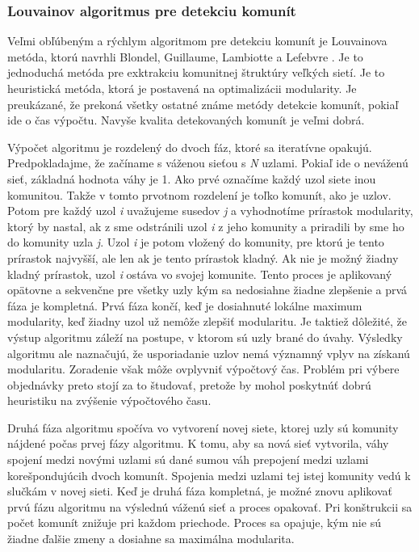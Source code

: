 \documentclass[slovak,master,public,dept460,male,cpdeclaration,oneside]{diploma}
\begin{document}
\subsubsection{Louvainov algoritmus pre detekciu komunít}

Veľmi obľúbeným a rýchlym algoritmom pre detekciu komunít je Louvainova metóda, ktorú navrhli Blondel, Guillaume, Lambiotte a Lefebvre \cite{12}. Je to jednoduchá metóda pre exktrakciu komunitnej štruktúry veľkých sietí. Je to heuristická metóda, ktorá je postavená na optimalizácii modularity. Je preukázané, že prekoná všetky ostatné známe metódy detekcie komunít, pokiaľ ide o čas výpočtu. Navyše kvalita detekovaných komunít je veľmi dobrá.


Výpočet algoritmu je rozdelený do dvoch fáz, ktoré sa iteratívne opakujú. Predpokladajme, že začíname s váženou sieťou s \textit{N} uzlami. Pokiaľ ide o neváženú sieť, základná hodnota váhy je 1. Ako prvé označíme každý uzol siete inou komunitou. Takže v tomto prvotnom rozdelení je toľko komunít, ako je uzlov. Potom pre každý uzol \textit{i} uvažujeme susedov \textit{j} a vyhodnotíme prírastok modularity, ktorý by nastal, ak z sme odstránili uzol \textit{i} z jeho komunity a priradili by sme ho do komunity uzla \textit{j}. Uzol \textit{i} je potom vložený do komunity, pre ktorú je tento prírastok najvyšší, ale len ak je tento prírastok kladný. Ak nie je možný žiadny kladný prírastok, uzol \textit{i} ostáva vo svojej komunite. Tento proces je aplikovaný opätovne a sekvenčne pre všetky uzly kým sa nedosiahne žiadne zlepšenie a prvá fáza je kompletná. Prvá fáza končí, keď je dosiahnuté lokálne maximum modularity, keď žiadny uzol už nemôže zlepšiť modularitu. Je taktiež dôležité, že výstup algoritmu záleží na postupe, v ktorom sú uzly brané do úvahy. Výsledky algoritmu ale naznačujú, že usporiadanie uzlov nemá významný vplyv na získanú modularitu. Zoradenie však môže ovplyvniť výpočtový čas. Problém pri výbere objednávky preto stojí za to študovať, pretože by mohol poskytnúť dobrú heuristiku na zvýšenie výpočtového času.


Druhá fáza algoritmu spočíva vo vytvorení novej siete, ktorej uzly sú komunity nájdené počas prvej fázy algoritmu. K tomu, aby sa nová sieť vytvorila, váhy spojení medzi novými uzlami sú dané sumou váh prepojení medzi uzlami korešpondujúcih dvoch komunít. Spojenia medzi uzlami tej istej komunity vedú k slučkám v novej sieti. Keď je druhá fáza kompletná, je možné znovu aplikovať prvú fázu algoritmu na výslednú váženú sieť a proces opakovať. Pri konštrukcii sa počet komunít znižuje pri každom priechode. Proces sa opajuje, kým nie sú žiadne ďalšie zmeny a dosiahne sa maximálna modularita.
\end{document}
